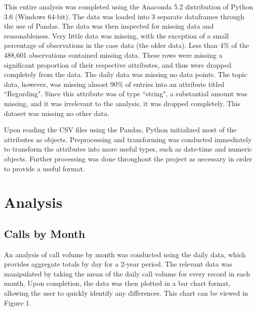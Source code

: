\documentclass[11pt,twocolumn]{article}
\begin{document}
This entire analysis was completed using the Anaconda 5.2 distribution of Python 3.6 (Windows 64-bit).  The data was loaded into 3 separate dataframes through the use of Pandas.  The data was then inspected for missing data and reasonableness.  Very little data was missing, with the exception of a small percentage of observations in the case data (the older data).  Less than 4\% of the 488,601 observations contained missing data.  These rows were missing a significant proportion of their respective attributes, and thus were dropped completely from the data.  The daily data was missing no data points.  The topic data, however, was missing almost 90\% of entries into an attribute titled ``Regarding".  Since this attribute was of type ``string", a substantial amount was missing, and it was irrelevant to the analysis, it was dropped completely.  This dataset was missing no other data.
\par
Upon reading the CSV files using the Pandas, Python initialized most of the attributes as objects.  Preprocessing and transforming was conducted immediately to transform the attributes into more useful types, such as date-time and numeric objects.  Further processing was done throughout the project as necessary in order to provide a useful format.



\section{Analysis}

	\subsection{Calls by Month}

An analysis of call volume by month was conducted using the daily data, which provides aggregate totals by day for a 2-year period. The relevant data was manipulated by taking the mean of the daily call volume for every record in each month.  Upon completion, the data was then plotted in a bar chart format, allowing the user to quickly identify any differences.  This chart can be viewed in Figure 1.
\end{document}
